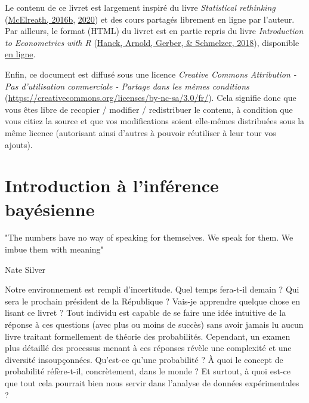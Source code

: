 \documentclass[
  a4paper,11pt,twoside,onecolumn,openright,final,oldfontcommands]{memoir}
\theoremstyle{definition}
\theoremstyle{definition}
\theoremstyle{definition}
\theoremstyle{remark}
\begin{document}
Le contenu de ce livret est largement inspiré du livre \emph{Statistical rethinking} (\protect\hyperlink{ref-mcelreath_statistical_2016}{McElreath, 2016b}, \protect\hyperlink{ref-mcelreath_statistical_2020}{2020}) et des cours partagés librement en ligne par l'auteur. Par ailleurs, le format (HTML) du livret est en partie repris du livre \emph{Introduction to Econometrics with R} (\protect\hyperlink{ref-hanck_introduction_2018}{Hanck, Arnold, Gerber, \& Schmelzer, 2018}), disponible \href{https://bookdown.org/machar1991/ITER/}{en ligne}.

Enfin, ce document est diffusé sous une licence \emph{Creative Commons Attribution - Pas d'utilisation commerciale - Partage dans les mêmes conditions} (\url{https://creativecommons.org/licenses/by-nc-sa/3.0/fr/}). Cela signifie donc que vous êtes libre de recopier / modifier / redistribuer le contenu, à condition que vous citiez la source et que vos modifications soient elle-mêmes distribuées sous la même licence (autorisant ainsi d'autres à pouvoir réutiliser à leur tour vos ajouts).

\hypertarget{introduction}{%
\chapter{Introduction à l'inférence bayésienne}\label{introduction}}


\epigraph{"The numbers have no way of speaking for themselves. We speak for them. We imbue them with meaning"}{Nate Silver}

Notre environnement est rempli d'incertitude. Quel temps fera-t-il demain ? Qui sera le prochain président de la République ? Vais-je apprendre quelque chose en lisant ce livret ? Tout individu est capable de se faire une idée intuitive de la réponse à ces questions (avec plus ou moins de succès) sans avoir jamais lu aucun livre traitant formellement de théorie des probabilités. Cependant, un examen plus détaillé des processus menant à ces réponses révèle une complexité et une diversité insoupçonnées. Qu'est-ce qu'une probabilité ? À quoi le concept de probabilité réfère-t-il, concrètement, dans le monde ? Et surtout, à quoi est-ce que tout cela pourrait bien nous servir dans l'analyse de données expérimentales ?
\end{document}
